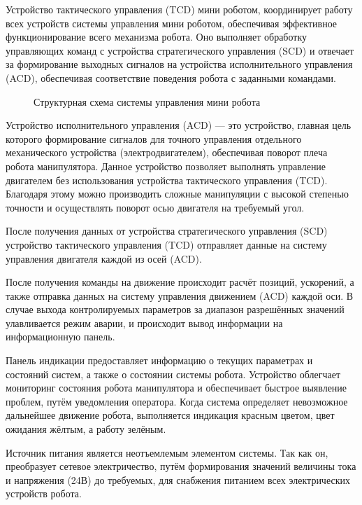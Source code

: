 Устройство тактического управления (TCD) мини роботом, координирует работу всех устройств системы управления мини роботом, обеспечивая эффективное функционирование всего механизма робота. Оно выполняет обработку управляющих команд с устройства стратегического управления (SCD) и отвечает за формирование выходных сигналов на устройства исполнительного управления (ACD), обеспечивая соответствие поведения робота с заданными командами.

\begin{figure}[H]
	\centering
	
	\caption{Структурная схема системы управления мини робота}
	\label{Structural}
\end{figure}

Устройство исполнительного управления (ACD) — это устройство, главная цель которого формирование сигналов для точного управления отдельного механического устройства (электродвигателем), обеспечивая поворот плеча робота манипулятора. Данное устройство позволяет выполнять управление двигателем без использования устройства тактического управления (TCD). Благодаря этому можно производить сложные манипуляции с высокой степенью точности и осуществлять поворот осью двигателя на требуемый угол.

После получения данных от устройства стратегического управления (SCD) устройство тактического управления (TCD) отправляет данные на систему управления двигателя каждой из осей (ACD).

После получения команды на движение происходит расчёт позиций, ускорений, а также отправка данных на систему управления движением (ACD) каждой оси. В случае выхода контролируемых параметров за диапазон разрешённых значений улавливается режим аварии, и происходит вывод информации на информационную панель.

Панель индикации предоставляет информацию о текущих параметрах и состояний систем, а также о состоянии системы робота. Устройство облегчает мониторинг состояния робота манипулятора и обеспечивает быстрое выявление проблем, путём уведомления оператора. Когда система определяет невозможное дальнейшее движение робота, выполняется индикация красным цветом, цвет ожидания жёлтым, а работу зелёным.

Источник питания является неотъемлемым элементом системы. Так как он, преобразует сетевое электричество, путём формирования значений величины тока и напряжения (24В) до требуемых, для снабжения питанием всех электрических устройств робота. 

